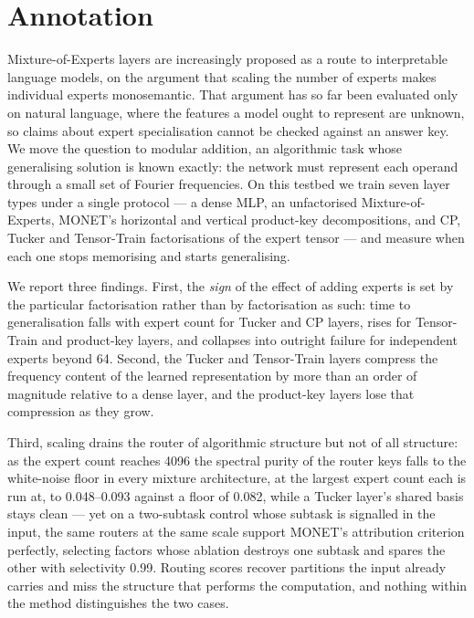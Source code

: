 \documentclass[a4paper,12pt]{extarticle}
\begin{document}

\newpage
\setcounter{page}{2}

{
	\hypersetup{linkcolor=black}
	\tableofcontents
}

\newpage

\section*{Annotation}

Mixture-of-Experts layers are increasingly proposed as a route to interpretable
language models, on the argument that scaling the number of experts makes
individual experts monosemantic. That argument has so far been evaluated only
on natural language, where the features a model ought to represent are unknown,
so claims about expert specialisation cannot be checked against an answer key.
We move the question to modular addition, an algorithmic task whose
generalising solution is known exactly: the network must represent each operand
through a small set of Fourier frequencies. On this testbed we train seven layer
types under a single protocol --- a dense MLP, an unfactorised
Mixture-of-Experts, MONET's horizontal and vertical product-key decompositions,
and CP, Tucker and Tensor-Train factorisations of the expert tensor --- and
measure when each one stops memorising and starts generalising.

We report three findings. First, the \emph{sign} of the effect of adding
experts is set by the particular factorisation rather than by factorisation as
such: time to generalisation falls with expert count for Tucker and CP layers,
rises for Tensor-Train and product-key layers, and collapses into outright
failure for independent experts beyond 64. Second, the Tucker and Tensor-Train layers compress the frequency content of the learned representation by more than an order of magnitude relative to a dense layer, and the product-key layers lose
that compression as they grow. 

Third, scaling drains the router of algorithmic structure but not of all
structure: as the expert count reaches 4096 the spectral purity of the router
keys falls to the white-noise floor in every mixture architecture, at the largest expert count each is run at, to 0.048--0.093 against a floor of 0.082, while a Tucker layer's shared basis
stays clean --- yet on a two-subtask control whose subtask is signalled in the
input, the same routers at the same scale support MONET's attribution
criterion perfectly, selecting factors whose ablation destroys one subtask and
spares the other with selectivity 0.99. Routing scores recover partitions the
input already carries and miss the structure that performs the computation,
and nothing within the method distinguishes the two cases.
\end{document}
